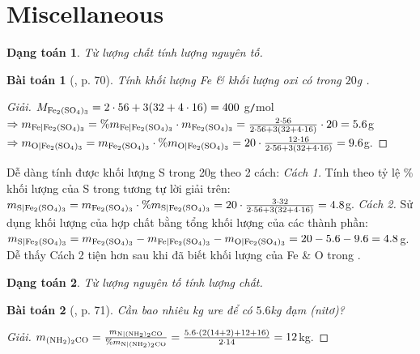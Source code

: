 \documentclass{article}
\newtheorem{baitoan}{Bài toán}
\newtheorem{dangtoan}{Dạng toán}
\begin{document}

\section{Miscellaneous}

\begin{dangtoan}
	Từ lượng chất tính lượng nguyên tố.
\end{dangtoan}

\begin{baitoan}[\cite{Tuan2022}, p. 70]
	Tính khối lượng \emph{Fe} \& khối lượng oxi có trong $20$\emph{g} \emph{}.
\end{baitoan}

\begin{proof}[Giải]
	$M_{\ce{Fe2(SO4)3}} = 2\cdot56 + 3(32 + 4\cdot16) = 400$ g\texttt{/}mol$\Rightarrow m_{\ce{Fe|Fe2(SO4)3}} = \%m_{\ce{Fe|Fe2(SO4)3}}\cdot m_{\ce{Fe2(SO4)3}} = \frac{2\cdot56}{2\cdot56 + 3(32 + 4\cdot16)}\cdot20 = 5.6$g$\Rightarrow m_{\ce{O|Fe2(SO4)3}} = m_{\ce{Fe2(SO4)3}}\cdot\%m_{\ce{O|Fe2(SO4)3}} = 20\cdot\frac{12\cdot16}{2\cdot56 + 3(32 + 4\cdot16)} = 9.6$g.
\end{proof}
Dễ dàng tính được khối lượng S trong 20g  theo 2 cách: \textit{Cách 1.} Tính theo tỷ lệ \% khối lượng của S trong  tương tự lời giải trên: $m_{\ce{S|Fe2(SO4)3}} = m_{\ce{Fe2(SO4)3}}\cdot\%m_{\ce{S|Fe2(SO4)3}} = 20\cdot\frac{3\cdot32}{2\cdot56 + 3(32 + 4\cdot16)} = 4.8$g. \textit{Cách 2.} Sử dụng khối lượng của hợp chất bằng tổng khối lượng của các thành phần: $m_{\ce{S|Fe2(SO4)3}} = m_{\ce{Fe2(SO4)3}} - m_{\ce{Fe|Fe2(SO4)3}} - m_{\ce{O|Fe2(SO4)3}} = 20 - 5.6 - 9.6 = 4.8$g. Dễ thấy Cách 2 tiện hơn sau khi đã biết khối lượng của Fe \& O trong .

\begin{dangtoan}
	Từ lượng nguyên tố tính lượng chất.
\end{dangtoan}

\begin{baitoan}[\cite{Tuan2022}, p. 71]
	Cần bao nhiêu \emph{kg} ure \emph{} để có $5.6$\emph{kg} đạm (nitơ)?
\end{baitoan}

\begin{proof}[Giải]
	$m_{\ce{(NH2)2CO}} = \frac{m_{\ce{N|(NH2)2CO}}}{\%m_{\ce{N|(NH2)2CO}}} = \frac{5.6\cdot(2(14 + 2) + 12 + 16)}{2\cdot14} = 12$kg.
\end{proof}
\end{document}
